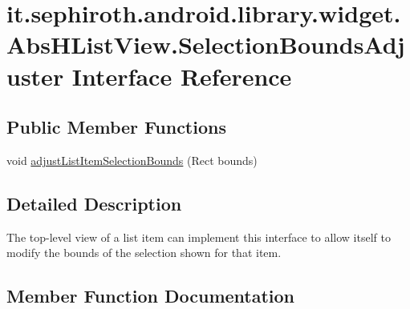 \hypertarget{interfaceit_1_1sephiroth_1_1android_1_1library_1_1widget_1_1_abs_h_list_view_1_1_selection_bounds_adjuster}{}\section{it.\+sephiroth.\+android.\+library.\+widget.\+Abs\+H\+List\+View.\+Selection\+Bounds\+Adjuster Interface Reference}
\label{interfaceit_1_1sephiroth_1_1android_1_1library_1_1widget_1_1_abs_h_list_view_1_1_selection_bounds_adjuster}
\subsection*{Public Member Functions}
\begin{DoxyCompactItemize}
\item 
void \hyperlink{interfaceit_1_1sephiroth_1_1android_1_1library_1_1widget_1_1_abs_h_list_view_1_1_selection_bounds_adjuster_a80ec9753af22a27964458b04b931d4d4}{adjust\+List\+Item\+Selection\+Bounds} (Rect bounds)
\end{DoxyCompactItemize}


\subsection{Detailed Description}
The top-\/level view of a list item can implement this interface to allow itself to modify the bounds of the selection shown for that item. 

\subsection{Member Function Documentation}
\mbox{\label{interfaceit_1_1sephiroth_1_1android_1_1library_1_1widget_1_1_abs_h_list_view_1_1_selection_bounds_adjuster_a80ec9753af22a27964458b04b931d4d4}} 
